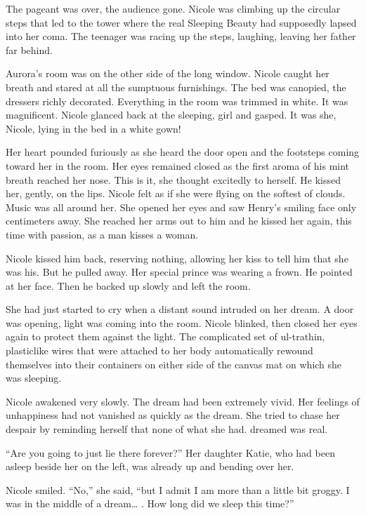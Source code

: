 \documentclass[]{article}
\begin{document}
{The pageant was over, the audience gone.  Nicole was climbing up the circular steps that led to the tower where the real Sleeping Beauty had supposedly lapsed into her coma.  The teenager was racing up the steps, laughing, leaving her father far behind.

Aurora’s room was on the other side of the long window.  Nicole caught her breath and stared at all the sumptuous furnishings.  The bed was canopied, the dressers richly decorated.  Everything in the room was trimmed in white.  It was magnificent.  Nicole glanced back at the sleeping, girl and gasped.  It was she, Nicole, lying in the bed in a white gown!

Her heart pounded furiously as she heard the door open and the footsteps coming toward her in the room.  Her eyes remained closed as the first aroma of his mint breath reached her nose.  This is it, she thought excitedly to herself.  He kissed her, gently, on the lips.  Nicole felt as if she were flying on the softest of clouds.  Music was all around her.  She opened her eyes and saw Henry’s smiling face only centimeters away.  She reached her arms out to him and he kissed her again, this time with passion, as a man kisses a woman.

Nicole kissed him back, reserving nothing, allowing her kiss to tell him that she was his.  But he pulled away.  Her special prince was wearing a frown.  He pointed at her face.  Then he backed up slowly and left the room.

She had just started to cry when a distant sound intruded on her dream.  A door was opening, light was coming into the room.  Nicole blinked, then closed her eyes again to protect them against the light.  The complicated set of ul-trathin, plasticlike wires that were attached to her body automatically rewound themselves into their containers on either side of the canvas mat on which she was sleeping.

Nicole awakened very slowly.  The dream had been extremely vivid.  Her feelings of unhappiness had not vanished as quickly as the dream.  She tried to chase her despair by reminding herself that none of what she had.  dreamed was real.

“Are you going to just lie there forever?” Her daughter Katie, who had been asleep beside her on the left, was already up and bending over her.

Nicole smiled.  “No,” she said, “but I admit I am more than a little bit groggy.  I was in the middle of a dream… .  How long did we sleep this time?”

}
\end{document}
